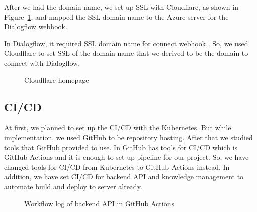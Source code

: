 \documentclass[12pt,oneside,openright,a4paper]{cpe-english-project}
\begin{document}
After we had the domain name, we set up SSL with Cloudflare,
as shown in Figure~\ref*{fig:Cloudflare homepage},
and mapped the SSL domain name to the Azure server for the Dialogflow webhook.

In Dialogflow, it required SSL domain name for connect webhook \cite{dialogflow_webhook_requirement}.
So, we used Cloudflare to set SSL of the domain name that we derived
to be the domain to connect with Dialogflow.

\begin{figure}[!h]\centering
	\caption{Cloudflare homepage}\label{fig:Cloudflare homepage}
\end{figure}
\pagebreak

\subsection{CI/CD}
At first, we planned to set up the CI/CD with the Kubernetes.
But while implementation, we used GitHub to be repository hosting.
After that we studied tools that GitHub provided to use.
In GitHub has tools for CI/CD which is GitHub Actions and
it is enough to set up pipeline for our project.
So, we have changed tools for CI/CD from Kubernetes to GitHub Actions instead.
In addition, we have set CI/CD for backend API and knowledge management to
automate build and deploy to server already.

\begin{figure}[!h]\centering
	\caption{Workflow log of backend API in GitHub Actions}\label{fig:ci-cd-be}
\end{figure}
\end{document}
